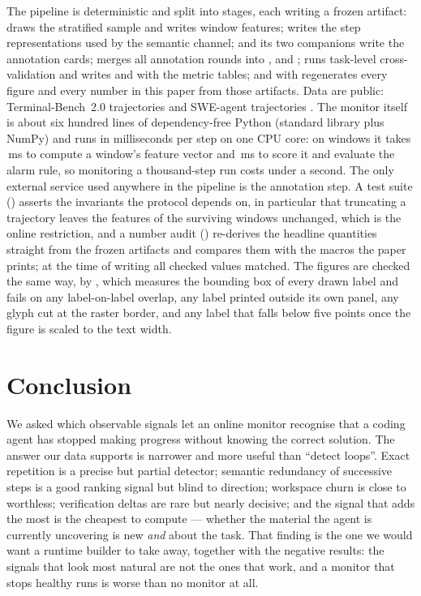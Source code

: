 The pipeline is deterministic and split into stages, each writing a frozen artifact:
 draws the stratified sample and writes window features;
 writes the step representations used by the semantic channel;
 and its two companions write the annotation cards;
 merges all annotation rounds into , 
and ;  runs task-level cross-validation and writes
 and  with the metric tables; and
 with  regenerates every figure and every number
in this paper from those artifacts. Data are public: Terminal-Bench~2.0 trajectories
\cite{yoonholee2026tb2} and SWE-agent trajectories \cite{nebius2024sweagenttraj}. The monitor itself is
about six hundred lines of dependency-free Python (standard library plus NumPy) and runs in milliseconds
per step on one CPU core: on \prtWindows{} windows it takes \prtMsPerWindow\,ms to compute a window's
feature vector and \prtMsPerStep\,ms to score it and evaluate the alarm rule, so monitoring a
thousand-step run costs under a second. The only external service used anywhere in the pipeline is the
annotation step. A test suite () asserts the invariants the protocol depends on, in
particular that truncating a trajectory leaves the features of the surviving windows unchanged, which is
the online restriction, and a number audit () re-derives the headline quantities
straight from the frozen artifacts and compares them with the macros the paper prints; at the time of
writing all \pauditChecked{} checked values matched. The figures are checked the same way, by
, which measures the bounding box of every drawn label and fails on any
label-on-label overlap, any label printed outside its own panel, any glyph cut at the raster border, and
any label that falls below five points once the figure is scaled to the text width.

\section{Conclusion}

We asked which observable signals let an online monitor recognise that a coding agent has stopped making
progress without knowing the correct solution. The answer our data supports is narrower and more useful
than ``detect loops''. Exact repetition is a precise but partial detector; semantic redundancy of
successive steps is a good ranking signal but blind to direction; workspace churn is close to worthless;
verification deltas are rare but nearly decisive; and the signal that adds the most is the cheapest to
compute --- whether the material the agent is currently uncovering is new \emph{and} about the task. That
finding is the one we would want a runtime builder to take away, together with the negative results: the
signals that look most natural are not the ones that work, and a monitor that stops healthy runs is worse
than no monitor at all.

